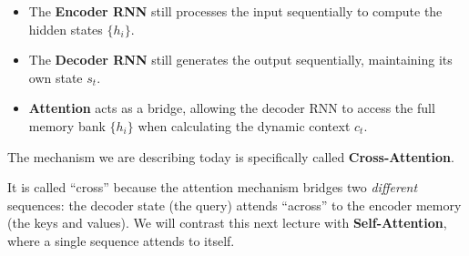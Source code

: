 \documentclass{article}
\begin{document}
\begin{itemize}
    \item The \textbf{Encoder RNN} still processes the input sequentially to compute the hidden states $\{h_i\}$.
    \item The \textbf{Decoder RNN} still generates the output sequentially, maintaining its own state $s_t$.
    \item \textbf{Attention} acts as a bridge, allowing the decoder RNN to access the full memory bank $\{h_i\}$ when calculating the dynamic context $c_t$.
\end{itemize}

\begin{tcolorbox}[colback=blue!5!white, colframe=blue!75!black, title=Terminology: Cross-Attention]
The mechanism we are describing today is specifically called \textbf{Cross-Attention}.

It is called ``cross'' because the attention mechanism bridges two \textit{different} sequences: the decoder state (the query) attends ``across'' to the encoder memory (the keys and values). We will contrast this next lecture with \textbf{Self-Attention}, where a single sequence attends to itself.
\end{tcolorbox}
\end{document}

